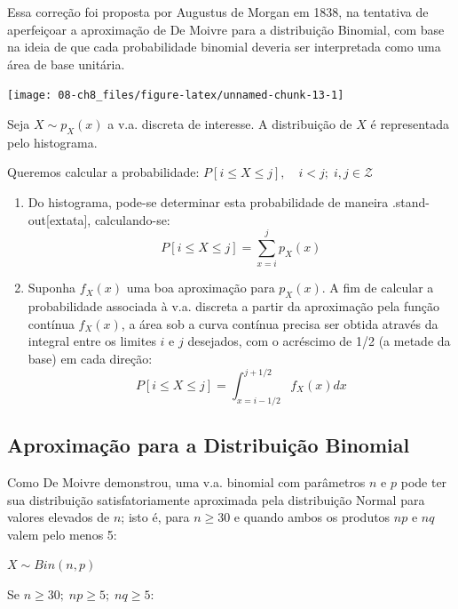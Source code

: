 \documentclass[
]{book}
\theoremstyle{definition}
\theoremstyle{definition}
\theoremstyle{definition}
\theoremstyle{remark}
\begin{document}
Essa correção foi proposta por Augustus de Morgan em 1838, na tentativa de aperfeiçoar a aproximação de De Moivre para a distribuição Binomial, com base na ideia de que cada probabilidade binomial deveria ser interpretada como uma área de base unitária.

\begin{center}\texttt{[image: 08-ch8\_files/figure-latex/unnamed-chunk-13-1]} \end{center}

Seja \(X \sim p_X(x)\) a v.a. discreta de interesse. A distribuição de \(X\) é representada pelo histograma.

Queremos calcular a probabilidade: \(P[i \leq X \leq j], \quad i < j;\; i,j \in \mathcal{Z}\)

\begin{enumerate}
\def\labelenumi{\roman{enumi}.}
\item
  Do histograma, pode-se determinar esta probabilidade de maneira .stand-out{[}extata{]}, calculando-se:\\
  \[P[i \leq X \leq j] = \sum_{x=i}^j p_X(x)\]
\item
  Suponha \(f_X(x)\) uma boa aproximação para \(p_X(x)\). A fim de calcular a probabilidade associada à v.a. discreta a partir da aproximação pela função contínua \(f_X(x)\), a área sob a curva contínua precisa ser obtida através da integral entre os limites \(i\) e \(j\) desejados, com o acréscimo de 1/2 (a metade da base) em cada direção:\\
  \[P[i \leq X \leq j] = \int_{x=i-1/2}^{j+1/2} f_X(x) dx\]
\end{enumerate}

\hypertarget{aproximauxe7uxe3o-para-a-distribuiuxe7uxe3o-binomial}{%
\subsection*{Aproximação para a Distribuição Binomial}\label{aproximauxe7uxe3o-para-a-distribuiuxe7uxe3o-binomial}}

Como De Moivre demonstrou, uma v.a. binomial com parâmetros \(n\) e \(p\) pode ter sua distribuição satisfatoriamente aproximada pela distribuição Normal para valores elevados de \(n\); isto é, para \(n ≥ 30\) e quando ambos os produtos \(np\) e \(nq\) valem pelo menos 5:

\(X \sim Bin (n, p)\)

Se \(n \geq 30; \; np \geq 5; \; nq \geq 5\):
\end{document}
